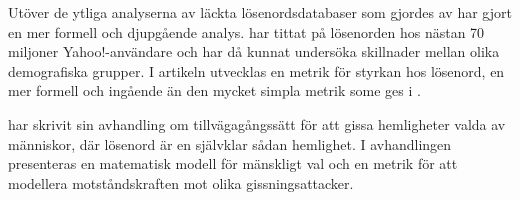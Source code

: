 \documentclass[a4paper]{article}
\theoremstyle{definition}
\theoremstyle{remark}
\begin{document}
Utöver de ytliga analyserna av läckta lösenordsdatabaser som gjordes av 
\citet{Cubrilovic2009rhf,Oberheide2010bao,Hunt2011abs,Cluley2012twp} har 
\citet{Bonneau2012sog} gjort en mer formell och djupgående analys.
\citeauthor{Bonneau2012sog} har tittat på lösenorden hos nästan 70 miljoner 
Yahoo!-användare och har då kunnat undersöka skillnader mellan olika 
demografiska grupper.
I artikeln utvecklas en metrik för styrkan hos lösenord, en mer formell och 
ingående än den mycket simpla metrik some ges i .

\citet{Bonneau2012ghs} har skrivit sin avhandling om tillvägagångssätt för att 
gissa hemligheter valda av människor, där lösenord är en självklar sådan 
hemlighet.
I avhandlingen presenteras en matematisk modell för mänskligt val och en metrik 
för att modellera motståndskraften mot olika gissningsattacker.




\printbibliography
\end{document}
